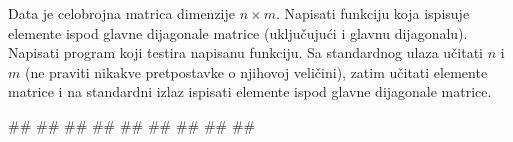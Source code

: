\begin{Answer}[ref=biblioteka]
\end{Answer}


\begin{Exercise}[label=332]
Data je celobrojna matrica dimenzije $n \times m$.
Napisati funkciju koja ispisuje elemente ispod glavne dijagonale matrice 
(uključujući i glavnu dijagonalu).
Napisati program koji testira napisanu funkciju. Sa standardnog
ulaza učitati $n$ i $m$ (ne praviti nikakve
pretpostavke o njihovoj veličini), zatim učitati elemente
matrice i na standardni izlaz ispisati elemente ispod glavne
dijagonale matrice.

\begin{miditest}
\begin{upotreba}{1}
#\naslovInt#
##
##
##
##
##
##
##
##
\end{upotreba}
\end{miditest}

\end{Exercise}
\begin{Answer}[ref=332]
\end{Answer}

